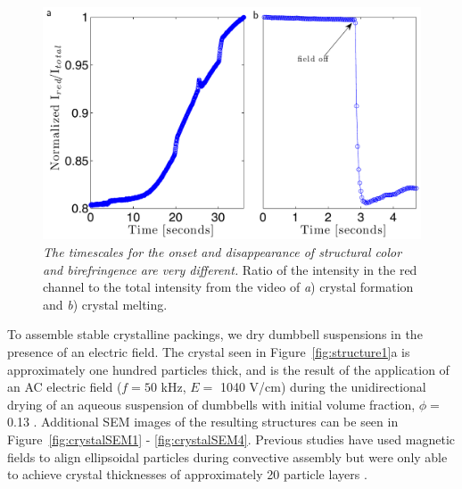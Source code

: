 \begin{figure}[htbp]
\centering
\includegraphics[width=1.0\textwidth]{figures/CsuppFigure2.pdf}
\caption{\label{fig:movie-quantification} \emph{The timescales for the onset and disappearance of structural color and birefringence are very different.}
	Ratio of the intensity in the red channel to the total intensity from the video of \emph{a}) crystal formation and \emph{b}) crystal melting.}
\end{figure}

 To assemble stable crystalline packings, we dry dumbbell suspensions  in the presence of an electric field.
 The crystal seen in  Figure~\ref{fig:structure1}a is approximately one hundred particles thick, and is the result of the application of an AC electric field ($f=50$ kHz, $E=$ 1040 V/cm) during the unidirectional drying of an aqueous suspension of dumbbells with initial volume fraction, $\phi=$ 0.13 \cite{Mittal2009}.
 Additional SEM images of the resulting structures can be seen in Figure~\ref{fig:crystalSEM1} - \ref{fig:crystalSEM4}.
 Previous studies have used magnetic fields to align ellipsoidal particles during convective assembly but were only able to achieve crystal thicknesses of approximately 20 particle layers \cite{Ding2009}.

